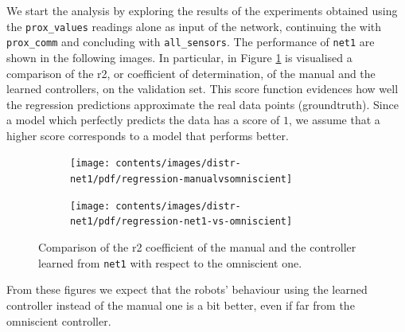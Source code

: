 We start the analysis by exploring the results of the experiments obtained 
using the \texttt{prox\_values} readings alone as input of the network, continuing 
the with \texttt{prox\_comm} and concluding with \texttt{all\_sensors}.
The performance of \texttt{net1} are shown in the following images. In particular,  
in Figure \ref{fig:net1r2} is visualised a comparison of the \gls{r2}, or coefficient 
of determination, of the manual and the learned controllers, on the validation set.
This score function evidences how well the regression predictions approximate 
the real data points (groundtruth). Since a model which perfectly predicts the data 
has a score of $1$, we assume that a higher score corresponds to a model that 
performs better.
\begin{figure}[!htb]
	\centering
	\begin{subfigure}[h]{0.49\textwidth}
		\centering
		\texttt{[image: contents/images/distr-net1/pdf/regression-manualvsomniscient]}%
	\end{subfigure}
	\hfill
	\begin{subfigure}[h]{0.49\textwidth}
		\centering
		\texttt{[image: contents/images/distr-net1/pdf/regression-net1-vs-omniscient]}
	\end{subfigure}
	\caption[Evaluation of the \gls{r2} coefficients of \texttt{net1} 
	.]{Comparison of 
	the \gls{r2} coefficient of the manual and the controller learned from 
	\texttt{net1} with respect to the omniscient one.}
	\label{fig:net1r2}
\end{figure}
From these figures we expect that the robots' behaviour using the learned 
controller instead of the manual one is a bit better, even if far from the omniscient 
controller.

